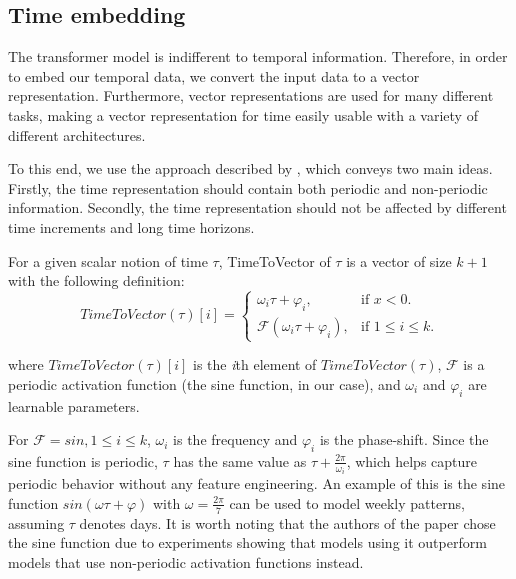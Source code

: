 \subsection{Time embedding}\label{sec:time2vec}
The transformer model is indifferent to temporal information.
Therefore, in order to embed our temporal data, we convert the input data to a vector representation.
Furthermore, vector representations are used for many different tasks, making a vector representation for time easily usable with a variety of different architectures.

To this end, we use the approach described by \citet{time2vec}, which conveys two main ideas.
Firstly, the time representation should contain both periodic and non-periodic information.
Secondly, the time representation should not be affected by different time increments and long time horizons.  

For a given scalar notion of time $\tau$, TimeToVector of $\tau$ is a vector of size $k + 1$ with the following definition:
$$
TimeToVector(\tau)[i] = 
\begin{cases}
  \omega_i \tau + \varphi_i, & \mbox{if $x<0$}.\\
  \mathcal{F}(\omega_i \tau + \varphi_i), & \mbox{if $1 \le i \le k$}.
\end{cases}
$$

where $TimeToVector(\tau)[i]$ is the \textit{i}th element of $TimeToVector(\tau)$, $\mathcal{F}$ is a periodic activation function (the sine function, in our case), and $\omega_i$ and $\varphi_i$ are learnable parameters. 

For $\mathcal{F} = sin, 1 \leq i \leq k$, $\omega_i$ is the frequency and $\varphi_i$ is the phase-shift.
Since the sine function is periodic, $\tau$ has the same value as $\tau + \frac{2\pi}{\omega_i}$, which helps capture periodic behavior without any feature engineering.
An example of this is the sine function $sin(\omega\tau + \varphi)$ with $\omega = \frac{2\pi}{7}$ can be used to model weekly patterns, assuming $\tau$ denotes days.
It is worth noting that the authors of the paper chose the sine function due to experiments showing that models using it outperform models that use non-periodic activation functions instead.\cite{time2vec}
